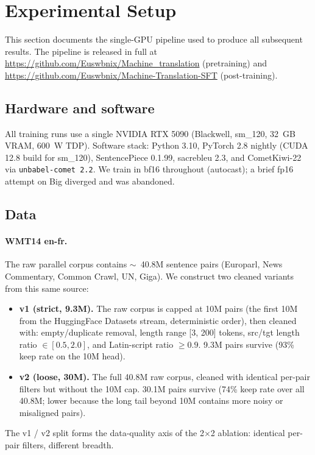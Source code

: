 \section{Experimental Setup}
\label{sec:setup}

This section documents the single-GPU pipeline used to produce all subsequent results. The pipeline is released in full at \url{https://github.com/Euswbnix/Machine_translation} (pretraining) and \url{https://github.com/Euswbnix/Machine-Translation-SFT} (post-training).

\subsection{Hardware and software}
All training runs use a single NVIDIA RTX 5090 (Blackwell, sm\_120, 32~GB VRAM, 600~W TDP). Software stack: Python 3.10, PyTorch 2.8 nightly (CUDA 12.8 build for sm\_120), SentencePiece 0.1.99, sacrebleu 2.3, and CometKiwi-22 via \texttt{unbabel-comet 2.2}. We train in bf16 throughout (autocast); a brief fp16 attempt on Big diverged and was abandoned.

\subsection{Data}
\paragraph{WMT14 en-fr.} The raw parallel corpus contains $\sim$~40.8M sentence pairs (Europarl, News Commentary, Common Crawl, UN, Giga). We construct two cleaned variants from this same source:
\begin{itemize}
\item \textbf{v1 (strict, 9.3M).} The raw corpus is capped at 10M pairs (the first 10M from the HuggingFace Datasets stream, deterministic order), then cleaned with: empty/duplicate removal, length range [3, 200] tokens, src/tgt length ratio $\in [0.5, 2.0]$, and Latin-script ratio $\geq 0.9$. 9.3M pairs survive (93\% keep rate on the 10M head).
\item \textbf{v2 (loose, 30M).} The full 40.8M raw corpus, cleaned with identical per-pair filters but without the 10M cap. 30.1M pairs survive (74\% keep rate over all 40.8M; lower because the long tail beyond 10M contains more noisy or misaligned pairs).
\end{itemize}
The v1 / v2 split forms the data-quality axis of the 2$\times$2 ablation: identical per-pair filters, different breadth.

